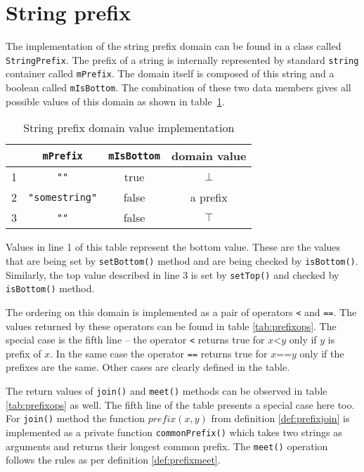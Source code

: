 \documentclass[12pt,final,oneside]{fithesis2}
\theoremstyle{definition}
\begin{document}
\section{String prefix}

The implementation of the string prefix domain can be found in a class called
\texttt{StringPrefix}. The prefix of a string is internally represented by
standard \texttt{string} container called \texttt{mPrefix}. The domain itself
is composed of this string and a boolean called \texttt{mIsBottom}.
The combination of these two data members gives all possible values of this
domain as shown in table~\ref{tab:stringprefix}.

\begin{table}[ht]
\centering
\begin{tabular}{r|c|c|c}
  & \texttt{mPrefix}      & \texttt{mIsBottom} & domain value \\
\hline
1 & \texttt{""}           & true      & $\bot$ \\
2 & \texttt{"somestring"} & false     & a prefix \\
3 & \texttt{""}           & false     & $\top$
\end{tabular}
\caption{String prefix domain value implementation}
\label{tab:stringprefix}
\end{table}

Values in line 1 of this table represent the bottom value. These are the values
that are being set by \texttt{setBottom()} method and are being checked
by \texttt{isBottom()}. Similarly, the top value described in line 3 is set
by \texttt{setTop()} and checked by \texttt{isBottom()} method.

The ordering on this domain is implemented as a pair of operators \texttt{<}
and \texttt{==}. The values returned by these operators can be found in table
\ref{tab:prefixops}. The special case is the fifth line -- the operator
\texttt{<} returns true for $x \texttt{<} y$ only if $y$ is prefix of $x$.
In the same case the operator \texttt{==} returns true for $x \texttt{==} y$
only if the prefixes are the same. Other cases are clearly defined in the table. 

The return values of \texttt{join()} and \texttt{meet()} methods can be
observed in table \ref{tab:prefixops} as well. The fifth line of the table
presents a special case here too. For \texttt{join()} method the function
$\textit{prefix}(x, y)$ from definition \ref{def:prefixjoin} is implemented
as a private function \texttt{commonPrefix()} which takes two strings as
arguments and returns their longest common prefix. The \texttt{meet()}
operation follows the rules as per definition \ref{def:prefixmeet}.
\end{document}
